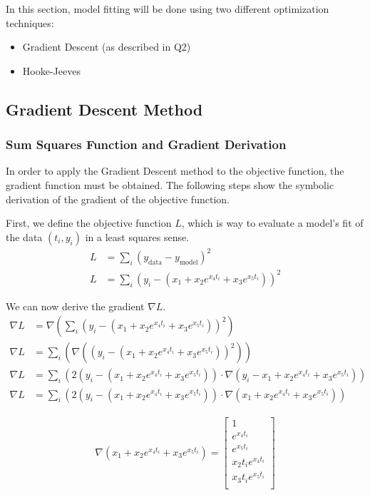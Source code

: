 \documentclass{article}
\begin{document}
    In this section, model fitting will be done using two different optimization techniques:
    \begin{itemize}
        \item Gradient Descent (as described in Q2)
        \item Hooke-Jeeves
    \end{itemize}

    \subsection{Gradient Descent Method}

    \subsubsection{Sum Squares Function and Gradient Derivation}

    In order to apply the Gradient Descent method to the objective function, the gradient function must be obtained. The following steps show the symbolic derivation of the gradient of the objective function.

    First, we define the objective function $L$, which is way to evaluate a model's fit of the data $(t_i, y_i)$ in a least squares sense.
    \begin{align}
    L &= \sum_i (y_{\text{data}} - y_{\text{model}})^2 \\
    L &= \sum_i (y_{i} - (x_1 + x_2 e ^ {x_4 t_i} + x_3 e ^{x_5 t_i}))^2
    \end{align}

    We can now derive the gradient $\nabla L$.
    \begin{align}
    \nabla L &= \nabla \left( \sum_i (y_{i} - (x_1 + x_2 e ^ {x_4 t_i} + x_3 e ^{x_5 t_i}))^2 \right) \\
    \nabla L &= \sum_i \left( \nabla \left( (y_{i} - (x_1 + x_2 e ^ {x_4 t_i} + x_3 e ^{x_5 t_i}))^2 \right) \right) \\
    \nabla L &= \sum_i \left( 2(y_{i} - (x_1 + x_2 e ^ {x_4 t_i} + x_3 e ^{x_5 t_i})) \cdot \nabla (y_{i} - x_1 + x_2 e ^ {x_4 t_i} + x_3 e ^{x_5 t_i}) \right) \\
    \nabla L &= \sum_i \left( 2(y_{i} - (x_1 + x_2 e ^ {x_4 t_i} + x_3 e ^{x_5 t_i})) \cdot \nabla (x_1 + x_2 e ^ {x_4 t_i} + x_3 e ^{x_5 t_i}) \right)
    \end{align}

    \begin{align}
        \nabla (x_1 + x_2 e ^ {x_4 t_i} + x_3 e ^{x_5 t_i}) = 
            \begin{bmatrix}
                1 \\
                e ^ {x_4 t_i} \\
                e ^ {x_5 t_i} \\
                x_2 t_i e ^ {x_4 t_i} \\
                x_3 t_i e ^{x_5 t_i} \\
            \end{bmatrix}
    \end{align}
\end{document}
